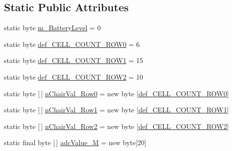 \subsection*{Static Public Attributes}
\begin{DoxyCompactItemize}
\item 
static byte \hyperlink{classcom_1_1nordicsemi_1_1venus_alpha01a_1_1_packet_parser_a778dbc4ad427127de156f29044c6f2a9}{m\+\_\+\+Battery\+Level} = 0
\item 
static byte \hyperlink{classcom_1_1nordicsemi_1_1venus_alpha01a_1_1_packet_parser_ae0e0f835b35a07baa0b18e1f62b12185}{def\+\_\+\+C\+E\+L\+L\+\_\+\+C\+O\+U\+N\+T\+\_\+\+R\+O\+W0} = 6
\item 
static byte \hyperlink{classcom_1_1nordicsemi_1_1venus_alpha01a_1_1_packet_parser_aae54ecd5edb7ba6e0ef5ea141721407d}{def\+\_\+\+C\+E\+L\+L\+\_\+\+C\+O\+U\+N\+T\+\_\+\+R\+O\+W1} = 15
\item 
static byte \hyperlink{classcom_1_1nordicsemi_1_1venus_alpha01a_1_1_packet_parser_aad65146dfb2376397cd15d3c8b5ccb1a}{def\+\_\+\+C\+E\+L\+L\+\_\+\+C\+O\+U\+N\+T\+\_\+\+R\+O\+W2} = 10
\item 
static byte \mbox{[}$\,$\mbox{]} \hyperlink{classcom_1_1nordicsemi_1_1venus_alpha01a_1_1_packet_parser_ac1fec76a40bac6c1e02323ea5af6cb2f}{n\+Chair\+Val\+\_\+\+Row0} = new byte \mbox{[}\hyperlink{classcom_1_1nordicsemi_1_1venus_alpha01a_1_1_packet_parser_ae0e0f835b35a07baa0b18e1f62b12185}{def\+\_\+\+C\+E\+L\+L\+\_\+\+C\+O\+U\+N\+T\+\_\+\+R\+O\+W0}\mbox{]}
\item 
static byte \mbox{[}$\,$\mbox{]} \hyperlink{classcom_1_1nordicsemi_1_1venus_alpha01a_1_1_packet_parser_a9ddcd99268402e24de48eaeb795f7e5a}{n\+Chair\+Val\+\_\+\+Row1} = new byte \mbox{[}\hyperlink{classcom_1_1nordicsemi_1_1venus_alpha01a_1_1_packet_parser_aae54ecd5edb7ba6e0ef5ea141721407d}{def\+\_\+\+C\+E\+L\+L\+\_\+\+C\+O\+U\+N\+T\+\_\+\+R\+O\+W1}\mbox{]}
\item 
static byte \mbox{[}$\,$\mbox{]} \hyperlink{classcom_1_1nordicsemi_1_1venus_alpha01a_1_1_packet_parser_ab1473c021b1c1dd740635c6810951f34}{n\+Chair\+Val\+\_\+\+Row2} = new byte \mbox{[}\hyperlink{classcom_1_1nordicsemi_1_1venus_alpha01a_1_1_packet_parser_aad65146dfb2376397cd15d3c8b5ccb1a}{def\+\_\+\+C\+E\+L\+L\+\_\+\+C\+O\+U\+N\+T\+\_\+\+R\+O\+W2}\mbox{]}
\item 
static final byte \mbox{[}$\,$\mbox{]} \hyperlink{classcom_1_1nordicsemi_1_1venus_alpha01a_1_1_packet_parser_a6d0f6c585dd7085f34d497ce62e11b45}{adc\+Value\+\_\+M} = new byte\mbox{[}20\mbox{]}
\item 

\end{DoxyCompactItemize}
